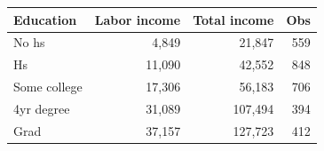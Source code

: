 \begin{tabular*}{\linewidth}{@{\extracolsep{\fill}}lrrr}\toprule
Education & Labor income & Total income & Obs \\
\midrule
No hs & 4,849 & 21,847 & 559 \\
Hs & 11,090 & 42,552 & 848 \\
Some college & 17,306 & 56,183 & 706 \\
4yr degree & 31,089 & 107,494 & 394 \\
Grad & 37,157 & 127,723 & 412 \\
\bottomrule
\end{tabular*}
